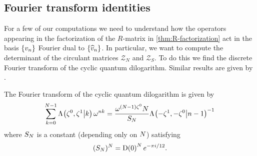 \documentclass{sl2ams}
\numberwithin{equation}{section}
\begin{document}
\subsection{Fourier transform identities}
For a few of our computations we need to understand how the operators appearing in the factorization of the \(R\)-matrix in \cref{thm:R-factorization} act in the basis \(\set{\vb n}\) Fourier dual to \(\set{\vbh n}\).
In particular, we want to compute the determinant of the circulant matrices \(\mathcal{Z}_N\) and \(\mathcal{Z}_S\).
To do this we find the discrete Fourier transform of the cyclic quantum dilogarithm.
Similar results are given by \citeauthor{Hikami2014} \cite{Hikami2014}.

\begin{theorem}
  \label{thm:qlf-fourier}
  The Fourier transform of the cyclic quantum dilogarithm is given by
  \begin{equation}
    \label{eq:qlf-fourier}
    \sum_{k=0}^{\nr-1}
    \qlf{\zeta^0, \zeta^1}{k} \omega^{nk}
    =
    \frac{
      \omega^{(\nr-1) \zeta^0} \nr
    }{
      S_{\nr}
    }
    \qlf{-\zeta^{1}, - \zeta^{0}}{n-1}^{-1}
  \end{equation}
  where \(S_{N}\) is a constant (depending only on \(N\)) satisfying
  \begin{equation}
    \label{eq:SN-value}
    (S_{\nr})^{\nr} = \df{0}^{\nr} e^{-\pi i/12}
    .
  \end{equation}
\end{theorem}
\end{document}
